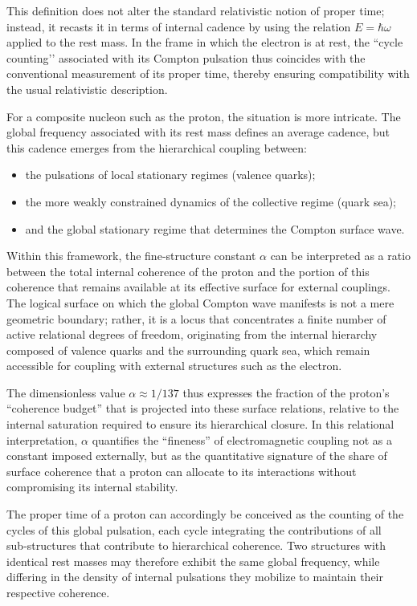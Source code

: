 \documentclass[11pt,a4paper]{article}
\begin{document}
This definition does not alter the standard relativistic notion of proper time; instead, it recasts it in terms of internal cadence by using the relation \(E = \hbar \omega\) applied to the rest mass. In the frame in which the electron is at rest, the “cycle counting’’ associated with its Compton pulsation thus coincides with the conventional measurement of its proper time, thereby ensuring compatibility with the usual relativistic description.

For a composite nucleon such as the proton, the situation is more intricate. The global frequency associated with its rest mass defines an average cadence, but this cadence emerges from the hierarchical coupling between:
\begin{itemize}[label=-]
  \item the pulsations of local stationary regimes (valence quarks);
  \item the more weakly constrained dynamics of the collective regime (quark sea);
  \item and the global stationary regime that determines the Compton surface wave.
\end{itemize}

Within this framework, the fine‑structure constant \(\alpha\) can be interpreted as a ratio between the total internal coherence of the proton and the portion of this coherence that remains available at its effective surface for external couplings. The logical surface on which the global Compton wave manifests is not a mere geometric boundary; rather, it is a locus that concentrates a finite number of active relational degrees of freedom, originating from the internal hierarchy composed of valence quarks and the surrounding quark sea, which remain accessible for coupling with external structures such as the electron. 

The dimensionless value \(\alpha \approx 1/137\) thus expresses the fraction of the proton’s “coherence budget” that is projected into these surface relations, relative to the internal saturation required to ensure its hierarchical closure. In this relational interpretation, \(\alpha\) quantifies the “fineness” of electromagnetic coupling not as a constant imposed externally, but as the quantitative signature of the share of surface coherence that a proton can allocate to its interactions without compromising its internal stability. 

The proper time of a proton can accordingly be conceived as the counting of the cycles of this global pulsation, each cycle integrating the contributions of all sub‑structures that contribute to hierarchical coherence. Two structures with identical rest masses may therefore exhibit the same global frequency, while differing in the density of internal pulsations they mobilize to maintain their respective coherence. 
\end{document}
